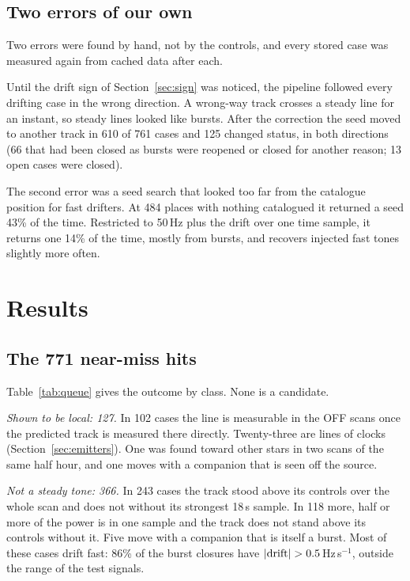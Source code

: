 \documentclass[twocolumn]{aastex631}
\newcommand{\hzs}{Hz\,s$^{-1}$}
\begin{document}
\subsection{Two errors of our own} \label{sec:errors}

Two errors were found by hand, not by the controls, and every stored case
was measured again from cached data after each.

Until the drift sign of Section~\ref{sec:sign} was noticed, the pipeline
followed every drifting case in the wrong direction. A wrong-way track
crosses a steady line for an instant, so steady lines looked like bursts.
After the correction the seed moved to another track in 610 of 761 cases
and 125 changed status, in both directions (66 that had been closed as
bursts were reopened or closed for another reason; 13 open cases were
closed).

The second error was a seed search that looked too far from the catalogue
position for fast drifters. At 484 places with nothing catalogued it
returned a seed 43\% of the time. Restricted to 50\,Hz plus the drift over
one time sample, it returns one 14\% of the time, mostly from bursts, and
recovers injected fast tones slightly more often.

\section{Results} \label{sec:results}

\subsection{The 771 near-miss hits} \label{sec:queue}

Table~\ref{tab:queue} gives the outcome by class. None is a candidate.

\emph{Shown to be local: 127.} In 102 cases the line is measurable in the
OFF scans once the predicted track is measured there directly. Twenty-three
are lines of clocks (Section~\ref{sec:emitters}). One was found toward
other stars in two scans of the same half hour, and one moves with a
companion that is seen off the source.

\emph{Not a steady tone: 366.} In 243 cases the track stood above its
controls over the whole scan and does not without its strongest 18\,s
sample. In 118 more, half or more of the power is in one sample and the
track does not stand above its controls without it. Five move with a
companion that is itself a burst. Most of these cases drift fast: 86\% of
the burst closures have $|{\rm drift}|>0.5$\,\hzs, outside the range of the
test signals.
\end{document}
